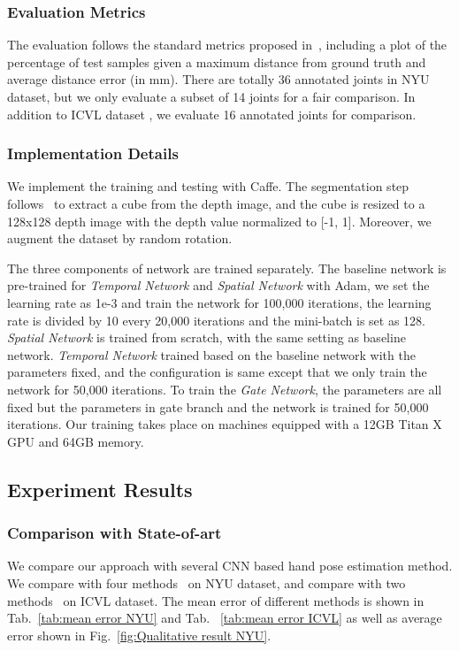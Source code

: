 \documentclass[journal,comsoc]{IEEEtran}
\begin{document}
\subsubsection{Evaluation Metrics}\label{sec:evaluation metrics}
The evaluation follows the standard metrics proposed in~\cite{tompson2014real}, including a
plot of the percentage of test samples given a maximum distance from ground truth and average
distance error (in mm). There are totally 36 annotated joints in NYU dataset, but we only
evaluate a subset of 14 joints for a fair comparison. In addition to ICVL dataset
, we evaluate 16 annotated joints for comparison.

\subsubsection{Implementation Details}\label{sec:implementation}
We implement the training and testing with Caffe\cite{jia2014caffe}. The segmentation step 
follows~\cite{oberweger2015hands} to extract a cube from the depth image, and the cube is 
resized to a 128x128 depth image with the depth value normalized to [-1, 1]. Moreover, we 
augment the dataset by random rotation.

The three components of network are trained separately. The baseline network is pre-trained for 
\emph{Temporal Network} and \emph{Spatial Network} with Adam, we set the learning rate as 1e-3
and train the network for 100,000 iterations, the learning rate is divided by 10 every 20,000 
iterations and the mini-batch is set as 128. \emph{Spatial Network} is trained from scratch, 
with the same setting as baseline network. \emph{Temporal Network} trained based on the baseline 
network with the parameters fixed, and the configuration is same except that we only train the 
network for 50,000 iterations.  To train the \emph{Gate Network}, the parameters are all fixed
but the parameters in gate branch and the network is trained for 50,000 iterations. Our training 
takes place on machines equipped with a 12GB Titan X GPU and 64GB memory.

\subsection{Experiment Results}\label{sec:experiment results}
\subsubsection{Comparison with State-of-art}\label{sec:comparison}
We compare our approach with several CNN based hand pose estimation method. We compare with 
four methods~\cite{tompson2014real, oberweger2015hands, oberweger2015training, zhou2016model} 
on NYU dataset, and compare with two methods~\cite{oberweger2015hands, zhou2016model} on ICVL 
dataset. The mean error of different methods is shown in Tab.~\ref{tab:mean error NYU} and Tab.
~\ref{tab:mean error ICVL} as well as average error shown in Fig.~\ref{fig:Qualitative result NYU}.
\end{document}
